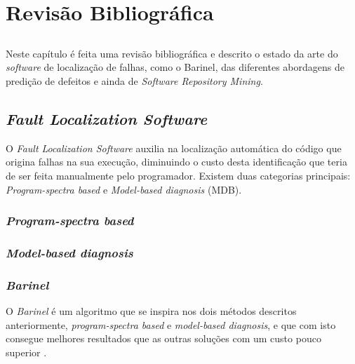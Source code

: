 \chapter{Revisão Bibliográfica} \label{chap:sota}

\section*{}

Neste capítulo é feita uma revisão bibliográfica e descrito o estado da arte do \emph{software} de localização de falhas, como o Barinel, das diferentes abordagens de predição de defeitos e ainda de \emph{Software Repository Mining}.

\section{\emph{Fault Localization Software}}

O \emph{Fault Localization Software} auxilia na localização automática do código que origina falhas na sua execução, diminuindo o custo desta identificação que teria de ser feita manualmente pelo programador. Existem duas categorias principais: \emph{Program-spectra based} e \emph{Model-based diagnosis} (MDB).

% 
%

\subsection{\emph{Program-spectra based}}

% 
%

\subsection{\emph{Model-based diagnosis}}

% 
%

\subsection{\emph{Barinel}}

O \emph{Barinel} é um algoritmo que se inspira nos dois métodos descritos anteriormente, \emph{program-spectra based} e \emph{model-based diagnosis}, e que com isto consegue melhores resultados que as outras soluções com um custo pouco superior \cite{Abreu2009}.


